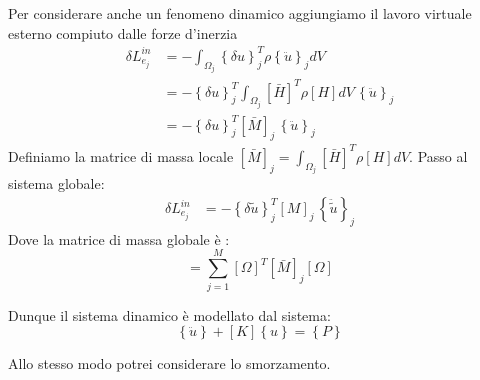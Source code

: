 Per considerare anche un fenomeno dinamico aggiungiamo il lavoro virtuale esterno compiuto dalle forze d'inerzia
\begin{align*}
 \delta L_{e_j}^{in} &=-\int_{\Omega_j}     \left\{\delta u\right\}_j^T  \rho\left\{\ddot{u}\right\}_j  dV\\
 &= - \left\{\delta u\right\}_j^T  \int_{\Omega_j}     [\bar{H}]^T  \rho[H]   dV \,\left\{\ddot{u}\right\}_j\\
 &= - \left\{\delta u\right\}_j^T  [\bar{M}]_j\,\left\{\ddot{u}\right\}_j
\end{align*}
Definiamo la matrice di massa locale  $ [\bar{M}]_j=  \int_{\Omega_j}     [\bar{H}]^T  \rho[H]   dV$. Passo al sistema globale:
\begin{align*}
 \delta L_{e_j}^{in} &= - \left\{\delta \tilde{u}\right\}_j^T  [M]_j\,\left\{\ddot{\tilde{u}}\right\}_j
\end{align*}
Dove la matrice di massa globale è :
\begin{equation*}
    [M] = \sum^M_{j=1} [\Omega]^T [\bar{M}]_j  [\Omega]
\end{equation*}

Dunque il sistema dinamico è modellato dal sistema:
\begin{equation*}
    [M]\left\{\ddot{u}\right\} + [K]\left\{u\right\} = \left\{P\right\}
\end{equation*}

Allo stesso modo  potrei considerare lo smorzamento.
